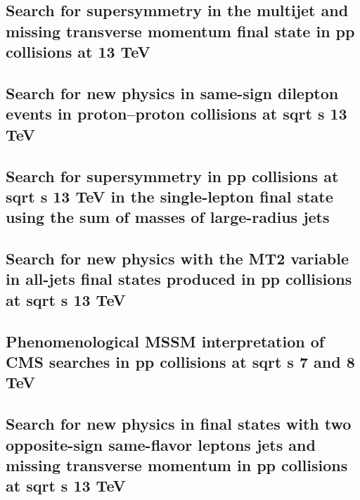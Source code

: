 \documentclass[a4paper, 11pt, twoside, openright]{report}
\begin{document}
\subsection{Search for supersymmetry in the multijet and missing transverse momentum final state in pp collisions at 13 TeV}


\subsection{Search for new physics in same-sign dilepton events in proton–proton collisions at sqrt s 13 TeV}


\subsection{Search for supersymmetry in pp collisions at sqrt s 13 TeV in the single-lepton final state using the sum of masses of large-radius jets}


\subsection{Search for new physics with the MT2 variable in all-jets final states produced in pp collisions at sqrt s 13 TeV}


\subsection{Phenomenological MSSM interpretation of CMS searches in pp collisions at sqrt s 7 and 8 TeV}


\subsection{Search for new physics in final states with two opposite-sign same-flavor leptons jets and missing transverse momentum in pp collisions at sqrt s 13 TeV}

\end{document}

